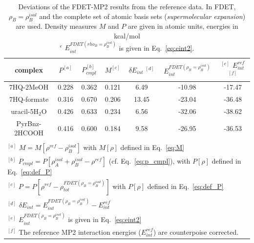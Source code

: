 \documentclass[amsmath,amssymb,preprint,aip,jcp]{revtex4-1}
\begin{document}
\begin{table}
{
\begin{center}
\begin{tabular}{|c|c|c|c|c|c|c|}
\hline
 complex & $P^{[a]}$ & $P_{cmpl}^{[b]}$ & $M^{[c]}$ & $\delta E_{int}\;^{[d]}$ & $E^{FDET(\rho_B=\rho_B^{isol})}_{int}$ & $^{[e]}$ $E_{int}^{ref}$ $^{[f]}$ \\ \hline
7HQ-2MeOH & 0.228 & 0.362 & 0.121 & 6.49 & -10.98 & -17.47 \\ \hline
7HQ-formate & 0.316 & 0.670 & 0.206 & 13.45 & -23.04 & -36.48 \\ \hline
uracil-5H$_2$O & 0.426 & 0.633 & 0.234 & 6.56 & -32.06 & -38.62 \\ \hline
PyrBnz-2HCOOH & 0.416 & 0.600 & 0.184 & 9.58 & -26.95 & -36.53 \\ \hline
\multicolumn{7}{c}{ } \\
\multicolumn{7}{l}{$^{[a]}$ $M=M[\rho^{ref} - \rho^{isol}_{B}]$ with $M[\rho]$ defined in Eq.~\ref{eq:M}}\\
\multicolumn{7}{l}{$^{[b]}$ $P_{cmpl}=P[\rho_A^{isol}+\rho_B^{isol} - \rho^{ref}]$ (cf. Eq.~\ref{eq:p_cmpl}), with $P[\rho]$ defined in Eq.~\ref{eq:def_P}}\\
\multicolumn{7}{l}{$^{[c]}$ $P=P[\rho^{ref} - \rho_{tot}^{FDET(\rho_B=\rho_B^{isol})}]$ with $P[\rho]$ defined in Eq.~\ref{eq:def_P}}\\
\multicolumn{7}{l}{$^{[d]}$ $\delta E_{int}=E^{FDET(\rho_B=\rho_B^{isol})}_{int}-E_{int}^{ref}$} \\
\multicolumn{7}{l}{$^{[e]}$ $E^{FDET(\rho_B=\rho_B^{isol})}_{int}$ is given in Eq.~\ref{eq:eint2}}\\
\multicolumn{7}{l}{$^{[f]}$ The reference MP2 interaction energies ($E_{int}^{ref}$) are counterpoise corrected.}
\end{tabular}
\end{center}
}%
\caption{Deviations of the FDET-MP2 results from the reference data. In FDET, $\rho_B=\rho_B^{isol}$ and the complete set of atomic basis sets ({\it supermolecular expansion}) are used. 
Density measures $M$ and $P$ are given in atomic units, energies in kcal/mol\\
$^e$ $E^{FDET(rho_B=\rho_B^{isol})}_{int}$ is given in Eq.~\ref{eq:eint2}.
}
\label{table:SE_isol}
\end{table}
\end{document}
